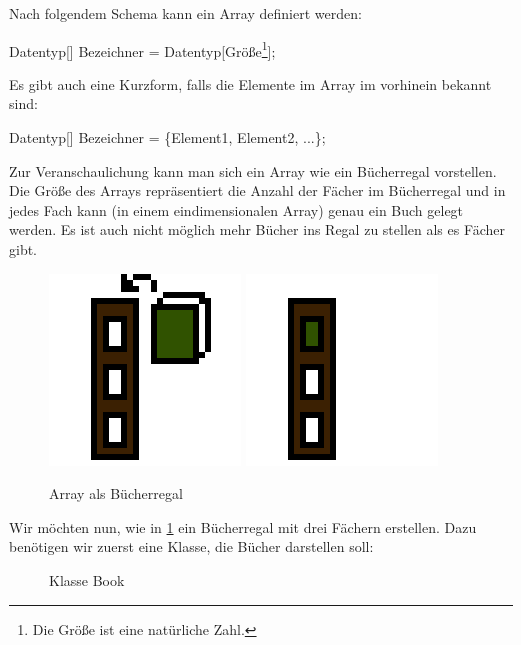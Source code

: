 \documentclass{tuda-pub}
\begin{document}
  \br

  Nach folgendem Schema kann ein Array definiert werden:

  \begin{center}
    Datentyp[] Bezeichner =  Datentyp[Größe\footnote{Die Größe ist eine
    natürliche Zahl.}];
  \end{center}

  Es gibt auch eine Kurzform, falls die Elemente im Array im vorhinein bekannt sind:

  \begin{center}
    Datentyp[] Bezeichner = \{Element1, Element2, ...\};
  \end{center}

  \br

  Zur Veranschaulichung kann man sich ein Array wie ein Bücherregal vorstellen. Die Größe des
  Arrays repräsentiert die Anzahl der Fächer im Bücherregal und in jedes Fach kann (in einem
  eindimensionalen Array) genau ein Buch gelegt werden. Es ist auch nicht möglich mehr Bücher ins
  Regal zu stellen als es Fächer gibt.

  \begin{figure}[h]
    \centering
    \includegraphics[width=.2\linewidth]{lib_1_1.png}
    \includegraphics[width=.2\linewidth]{lib_1_2.png}
    \caption{Array als Bücherregal}
    \label{fig:books_arr}
  \end{figure}

  \clearpage

  Wir möchten nun, wie in \ref{fig:books_arr} ein Bücherregal mit drei Fächern erstellen. Dazu
  benötigen wir zuerst eine Klasse, die Bücher darstellen soll:

  \begin{figure}[h]
    \centering
    
    \caption{Klasse Book}
  \end{figure}
\end{document}
